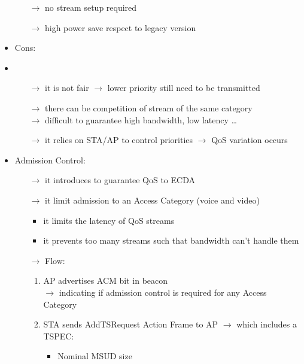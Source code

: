\begin{itemize}
\begin{itemize}
        \item[$\rightarrow$] no stream setup required
        \item[$\rightarrow$] high power save respect to legacy version 
    \end{itemize}
    \item Cons:
    \item \begin{itemize}
        \item[$\rightarrow$] it is not fair $\rightarrow$ lower priority still need to be transmitted
        \item[$\rightarrow$] there can be competition of stream of the same category\\
        $\rightarrow$ difficult to guarantee high bandwidth, low latency \dots
        \item[$\rightarrow$] it relies on STA/AP to control priorities $\rightarrow$ QoS variation occurs
    \end{itemize}
    \item Admission Control:
    \begin{itemize}
        \item[$\rightarrow$] it introduces to guarantee QoS to ECDA
        \item[$\rightarrow$] it limit admission to an Access Category (voice and video)
        \begin{itemize}
            \item it limits the latency of QoS streams
            \item it prevents too many streams such that bandwidth can't handle them
        \end{itemize}
        \item[$\rightarrow$] Flow:
        \begin{enumerate}
            \addtolength{\itemindent}{-0.3cm}
            \item AP advertises ACM bit in beacon\\
           \hspace*{-0.3cm}$\rightarrow$ indicating if admission control is required for any Access Category
           \item STA sends AddTS\footAddTS Request Action Frame to AP $\rightarrow$ which includes a
           \hspace*{-0.3cm}TSPEC:
           \begin{itemize}
            \addtolength{\itemindent}{-0.3cm}
            \item Nominal MSUD size

\end{itemize}
\end{enumerate}
\end{itemize}
\end{itemize}
